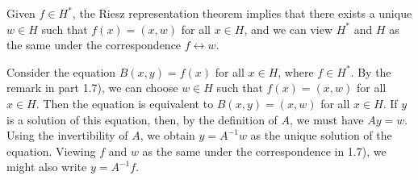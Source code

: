 \documentclass{homework}
\begin{document}
\begin{arabicparts}
		\questionpart
		Given $f \in H^{*}$, the Riesz representation theorem implies that there exists a unique $w \in H$ such that $f(x) = (x,w)$ for all $x \in H$, and we can view $H^{*}$ and $H$ as the same under the correspondence $f \leftrightarrow w$.
		
		\questionpart
		Consider the equation $B(x,y) = f(x)$ for all $x \in H$, where $f \in H^{*}$. By the remark in part 1.7), we can choose $w \in H$ such that $f(x) = (x,w)$ for all $x \in H$. Then the equation is equivalent to $B(x,y) = (x,w)$ for all $x \in H$. If $y$ is a solution of this equation, then, by the definition of $A$, we must have $Ay = w$. Using the invertibility of $A$, we obtain $y = A^{-1}w$ as the unique solution of the equation. Viewing $f$ and $w$ as the same under the correspondence in 1.7), we might also write $y = A^{-1}f$.
	\end{arabicparts}
	
\end{document}
